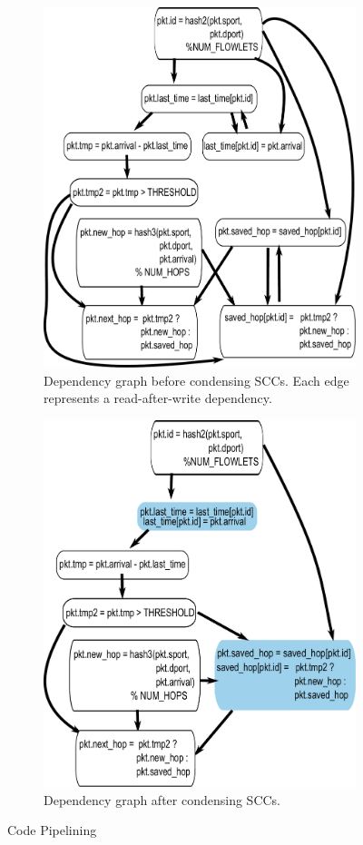 \begin{figure}[!t]
\begin{subfigure}{0.5\textwidth}
  \includegraphics[width=0.8\columnwidth]{deps.pdf}
  \caption{Dependency graph before condensing SCCs. Each edge represents
  a read-after-write dependency.}
  \label{fig:partitioning_before}
\end{subfigure}
\begin{subfigure}{0.5\textwidth}
\includegraphics[width=0.8\columnwidth]{scc.pdf}
\caption{Dependency graph after condensing SCCs.}
\label{fig:partitioning_after}
\end{subfigure}
\caption{Code Pipelining}
\label{fig:pipelining}
\end{figure}


